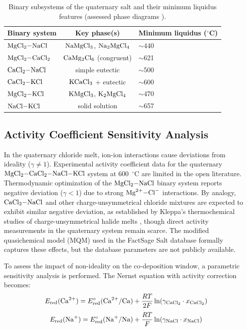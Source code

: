 \documentclass[11pt]{article}
\begin{document}
\begin{table}[!ht]
\centering
\footnotesize
\caption{Binary subsystems of the quaternary salt and their minimum liquidus features (assessed phase diagrams \cite{chartrand2000}).}
\label{tab:binary}
\begin{tabular}{lcl}
\toprule
Binary system & Key phase(s) & Minimum liquidus ($^{\circ}$C) \\
\midrule
$\ce{MgCl2-NaCl}$ & $\ce{NaMgCl3}$, $\ce{Na2MgCl4}$ & $\sim$440 \\
$\ce{MgCl2-CaCl2}$ & $\ce{CaMg2Cl6}$ (congruent) & $\sim$621 \\
$\ce{CaCl2-NaCl}$ & simple eutectic & $\sim$500 \\
$\ce{CaCl2-KCl}$ & $\ce{KCaCl3}$ + eutectic & $\sim$600 \\
$\ce{MgCl2-KCl}$ & $\ce{KMgCl3}$, $\ce{K2MgCl4}$ & $\sim$470 \\
$\ce{NaCl-KCl}$ & solid solution & $\sim$657 \\
\bottomrule
\end{tabular}
\end{table}

\subsection*{Activity Coefficient Sensitivity Analysis}
\label{subsec:activity}

In the quaternary chloride melt, ion-ion interactions cause deviations from ideality ($\gamma \neq 1$). Experimental activity coefficient data for the quaternary $\ce{MgCl2-CaCl2-NaCl-KCl}$ system at 600~$^{\circ}$C are limited in the open literature. Thermodynamic optimization of the $\ce{MgCl2-NaCl}$ binary system \cite{chartrand2000} reports negative deviation ($\gamma < 1$) due to strong $\ce{Mg^{2+}-Cl^{-}}$ interactions. By analogy, $\ce{CaCl2-NaCl}$ and other charge-unsymmetrical chloride mixtures are expected to exhibit similar negative deviation, as established by Kleppa's thermochemical studies of charge-unsymmetrical halide melts \cite{kleppa1966}, though direct activity measurements in the quaternary system remain scarce. The modified quasichemical model (MQM) used in the FactSage Salt database \cite{pelton2000mqm} formally captures these effects, but the database parameters are not publicly available.

To assess the impact of non-ideality on the co-deposition window, a parametric sensitivity analysis is performed. The Nernst equation with activity correction becomes:
\begin{equation}
\label{eq:canernst}
E_{\mathrm{red}}(\ce{Ca^{2+}}) = E^{\circ}_{\mathrm{red}}(\ce{Ca^{2+}/Ca}) + \frac{RT}{2F}\ln(\gamma_{\ce{CaCl2}} \cdot x_{\ce{CaCl2}})
\end{equation}
\begin{equation}
\label{eq:naernst}
E_{\mathrm{red}}(\ce{Na+}) = E^{\circ}_{\mathrm{red}}(\ce{Na+/Na}) + \frac{RT}{F}\ln(\gamma_{\ce{NaCl}} \cdot x_{\ce{NaCl}})
\end{equation}
\end{document}
